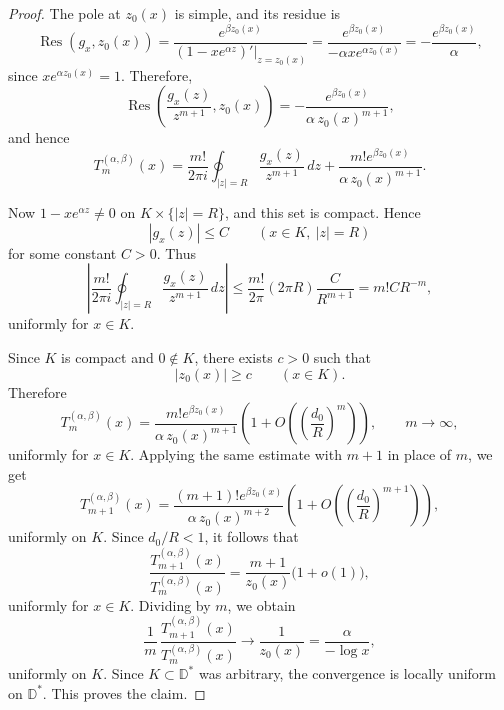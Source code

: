 \documentclass[10pt,a4paper]{amsart}
\begin{document}
\begin{proof}
The pole at \(z_0(x)\) is simple, and its residue is
\[
\operatorname{Res}(g_x,z_0(x))
=
\frac{e^{\beta z_0(x)}}{(1-x e^{\alpha z})'|_{z=z_0(x)}}
=
\frac{e^{\beta z_0(x)}}{-\alpha x e^{\alpha z_0(x)}}
=
-\frac{e^{\beta z_0(x)}}{\alpha},
\]
since \(x e^{\alpha z_0(x)}=1\). Therefore,
\[
\operatorname{Res}\!\left(\frac{g_x(z)}{z^{m+1}},z_0(x)\right)
=
-\frac{e^{\beta z_0(x)}}{\alpha\,z_0(x)^{m+1}},
\]
and hence
\[
T_m^{(\alpha,\beta)}(x)
=
\frac{m!}{2\pi i}\oint_{|z|=R}\frac{g_x(z)}{z^{m+1}}\,dz
+
\frac{m!e^{\beta z_0(x)}}{\alpha\,z_0(x)^{m+1}}.
\]

Now \(1-xe^{\alpha z}\neq0\) on \(K\times\{|z|=R\}\), and this set is compact. Hence
\[
|g_x(z)|\le C
\qquad (x\in K,\ |z|=R)
\]
for some constant \(C>0\). Thus
\[
\left|
\frac{m!}{2\pi i}\oint_{|z|=R}\frac{g_x(z)}{z^{m+1}}\,dz
\right|
\le
\frac{m!}{2\pi}(2\pi R)\frac{C}{R^{m+1}}
=
m!CR^{-m},
\]
uniformly for \(x\in K\).

Since \(K\) is compact and \(0\notin K\), there exists \(c>0\) such that
\[
|z_0(x)|\ge c
\qquad (x\in K).
\]
Therefore
\[
T_m^{(\alpha,\beta)}(x)
=
\frac{m!e^{\beta z_0(x)}}{\alpha\,z_0(x)^{m+1}}
\left(
1+O\!\left(\left(\frac{d_0}{R}\right)^m\right)
\right),
\qquad m\to\infty,
\]
uniformly for \(x\in K\). Applying the same estimate with \(m+1\) in place of \(m\), we get
\[
T_{m+1}^{(\alpha,\beta)}(x)
=
\frac{(m+1)!e^{\beta z_0(x)}}{\alpha\,z_0(x)^{m+2}}
\left(
1+O\!\left(\left(\frac{d_0}{R}\right)^{m+1}\right)
\right),
\]
uniformly on \(K\). Since \(d_0/R<1\), it follows that
\[
\frac{T_{m+1}^{(\alpha,\beta)}(x)}{T_m^{(\alpha,\beta)}(x)}
=
\frac{m+1}{z_0(x)}\bigl(1+o(1)\bigr),
\]
uniformly for \(x\in K\). Dividing by \(m\), we obtain
\[
\frac1m\,\frac{T_{m+1}^{(\alpha,\beta)}(x)}{T_m^{(\alpha,\beta)}(x)}
\longrightarrow
\frac1{z_0(x)}
=
\frac{\alpha}{-\log x},
\]
uniformly on \(K\). Since \(K\subset\mathbb D^\ast\) was arbitrary, the convergence is locally uniform on \(\mathbb D^\ast\).
This proves the claim.
\end{proof}
\end{document}
